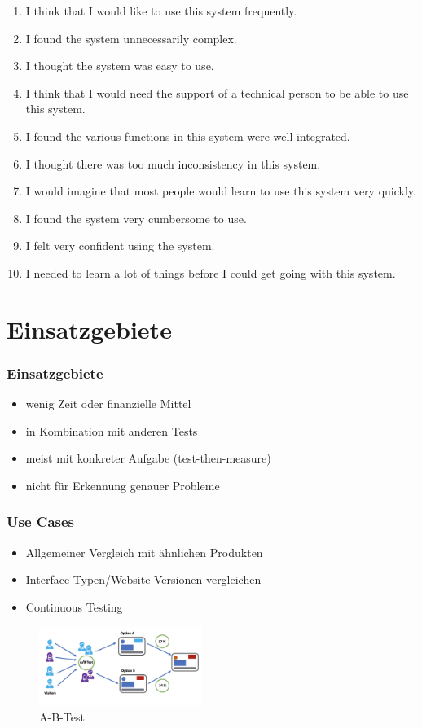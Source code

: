\documentclass[12pt, aspectratio=169]{beamer}
\begin{document}
\begin{frame}
	\begin{enumerate}
		\item <1> I think that I would like to use this system frequently.
		\item <1> I found the system unnecessarily complex.
		\item <1> I thought the system was easy to use.
		\item <1> I think that I would need the support of a technical person to be able to use this system.
		\item <1> I found the various functions in this system were well integrated.
		\item <1> I thought there was too much inconsistency in this system.
		\item <1> I would imagine that most people would learn to use this system very quickly.
		\item <1> I found the system very cumbersome to use.
		\item <1> I felt very confident using the system.
		\item <1> I needed to learn a lot of things before I could get going with this system.
	\end{enumerate}
\end{frame}

\section{Einsatzgebiete}
\begin{frame}
	\frametitle{Einsatzgebiete}
	\begin{itemize}
		\item<1> wenig Zeit oder finanzielle Mittel
		\item<1> in Kombination mit anderen Tests
		\item<1> meist mit konkreter Aufgabe (test-then-measure)
		\item<1> nicht für Erkennung genauer Probleme
	\end{itemize}
\end{frame}

	
\begin{frame}
	\frametitle{Use Cases}
	\vspace{20px}
	\begin{itemize}
		\item<1> Allgemeiner Vergleich mit ähnlichen Produkten
		\item<1> Interface-Typen/Website-Versionen vergleichen
		\item<1> Continuous Testing
	\end{itemize}
	\vspace{15px}
	\begin{figure}
		\includegraphics[keepaspectratio=true, width=200px]{./image/ab.png}
		\caption{A-B-Test \tiny{\cite{pic2}}}
	\end{figure}
\end{frame}
\end{document}
